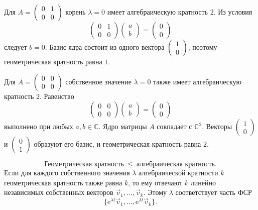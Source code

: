 \documentclass[12pt,a4paper]{article}
\numberwithin{equation}{section}
\newcommand{\vect}[1]{\vec{#1}}
\newcommand{\e}{\mathrm{e}}
\begin{document}
\begin{exampleHSE}[Пример 1]
Для $A=\begin{pmatrix}0&1\\0&0\end{pmatrix}$ корень $\lambda=0$
имеет алгебраическую кратность $2$. Из условия
\[
 \begin{pmatrix}0&1\\0&0\end{pmatrix}\begin{pmatrix}a\\b\end{pmatrix}
 =\begin{pmatrix}0\\0\end{pmatrix}
\]
следует $b=0$. Базис ядра состоит из одного вектора
$\begin{pmatrix}1\\0\end{pmatrix}$, поэтому геометрическая кратность равна $1$.
\end{exampleHSE}

\begin{exampleHSE}[Пример 2]
Для $A=\begin{pmatrix}0&0\\0&0\end{pmatrix}$ собственное значение
$\lambda=0$ также имеет алгебраическую кратность $2$. Равенство
\[
 \begin{pmatrix}0&0\\0&0\end{pmatrix}\begin{pmatrix}a\\b\end{pmatrix}
 =\begin{pmatrix}0\\0\end{pmatrix}
\]
выполнено при любых $a,b\in\mathbb C$. Ядро матрицы $A$ совпадает с
$\mathbb C^2$. Векторы
$\begin{pmatrix}1\\0\end{pmatrix}$ и $\begin{pmatrix}0\\1\end{pmatrix}$
образуют его базис, и геометрическая кратность равна $2$.
\end{exampleHSE}

\[
 \boxed{\text{Геометрическая кратность}\ \leq\ \text{алгебраическая кратность}.}
\]
Если для каждого собственного значения $\lambda$ алгебраической
кратности $k$ геометрическая кратность также равна $k$, то ему отвечают
$k$ линейно независимых собственных векторов $\vect v_1,\ldots,\vect v_k$.
Этому $\lambda$ соответствует часть ФСР
\[
 \bigl\{\e^{\lambda t}\vect v_1,\ldots,\e^{\lambda t}\vect v_k\bigr\}.
\]
\end{document}
